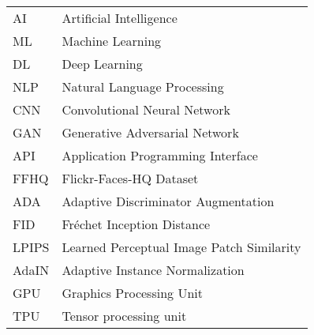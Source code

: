 \begin{tabular}{l l}
AI & Artificial Intelligence \\
ML & Machine Learning \\
DL & Deep Learning \\
NLP & Natural Language Processing \\
CNN & Convolutional Neural Network \\
GAN & Generative Adversarial Network \\
API & Application Programming Interface \\
FFHQ & Flickr-Faces-HQ Dataset \\
ADA & Adaptive Discriminator Augmentation \\
FID & Fréchet Inception Distance \\
LPIPS & Learned Perceptual Image Patch Similarity \\
AdaIN & Adaptive Instance Normalization \\
GPU & Graphics Processing Unit \\
TPU & Tensor processing unit
\end{tabular}